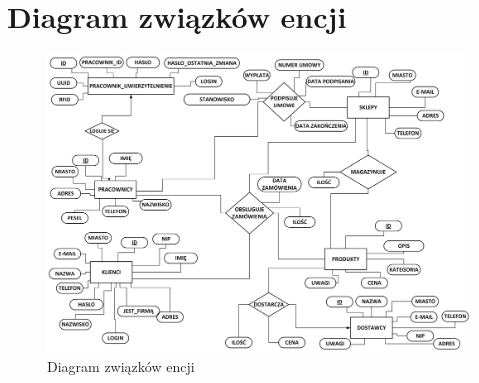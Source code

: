 \documentclass[12pt,a4paper]{article}
\begin{document}
    \section{Diagram związków encji} 
        \begin{figure}[H]
            \centering
            \includegraphics[width=\textwidth]{images/Encja.png}
            \caption{Diagram związków encji}
        \end{figure}
        
\end{document}
